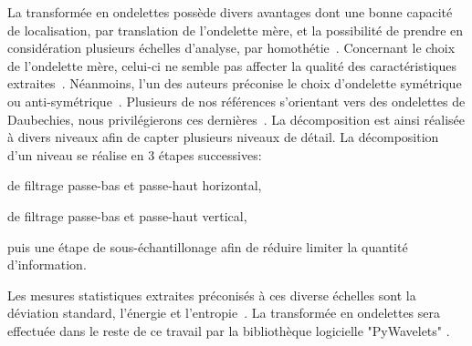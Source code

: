 La transformée en ondelettes possède divers avantages dont une bonne capacité de localisation, par translation de l'ondelette mère, et la possibilité de prendre en considération plusieurs échelles d'analyse, par homothétie~\cite{Livens1997,Wiltgen2008}. Concernant le choix de l'ondelette mère, celui-ci ne semble pas affecter la qualité des caractéristiques extraites~\cite{Fatemi1996, Livens1997}. Néanmoins, l'un des auteurs préconise le choix d'ondelette symétrique ou anti-symétrique~\cite{Livens1997}. Plusieurs de nos références s'orientant vers des ondelettes de Daubechies, nous privilégierons ces dernières~\cite{Wiltgen2008,Halimi2017a}. La décomposition est ainsi réalisée à divers niveaux afin de capter plusieurs niveaux de détail. La décomposition d'un niveau se réalise en 3 étapes successives: 
\begin{inlinerate}
    \item de filtrage passe-bas et passe-haut horizontal,
    \item de filtrage passe-bas et passe-haut vertical,
    \item puis une étape de sous-échantillonage afin de réduire limiter la quantité d'information.
\end{inlinerate} Les mesures statistiques extraites préconisés à ces diverse échelles sont la déviation standard, l'énergie et l'entropie~\cite{Livens1997, Wiltgen2008}. La transformée en ondelettes sera effectuée dans le reste de ce travail par la bibliothèque logicielle "PyWavelets" \cite{lee2006pywavelets}.\par

